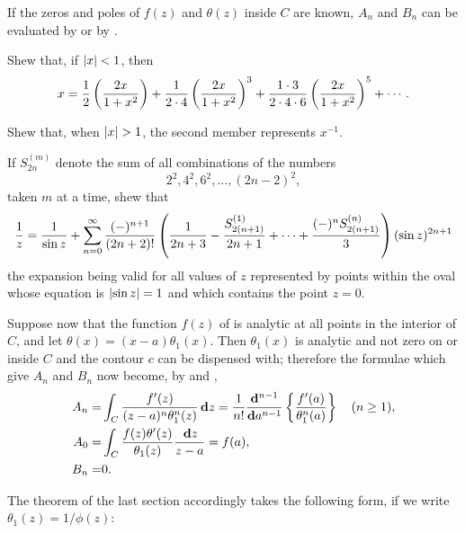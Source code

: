 If the zeros and poles of $f(z)$ and $\theta(z)$ inside $C$ are known,
$A_{n}$ and $B_{n}$ can be evaluated by or
by .

\begin{wandwexample}
  Shew that, if $\left| x \right| < 1$, then
  $$
  x
  =
  \frac{1}{2} \left(  \frac{2x}{1+x^{2}}  \right)
  +
  \frac{1}{2 \cdot 4} \left(  \frac{2x}{1+x^{2}}  \right)^{3}
  +
  \frac{1\cdot 3}{2 \cdot 4 \cdot 6} \left(  \frac{2x}{1+x^{2}}  \right)^{5}
  +
  \cdots.
  $$

  Shew that, when $\left| x \right| > 1$, the second member represents $x^{-1}$.
\end{wandwexample}
If $S^{(m)}_{2n}$ denote the sum of all combinations of the numbers
$$
2^{2}, 4^{2}, 6^{2}, \ldots, (2n-2)^{2},
$$
taken $m$ at a time, shew that
$$
\frac{1}{z}
=
\frac{1}{\sin z}
+
\sum_{n=0}^{\infty}
\frac{(-)^{n+1}}{ (2n+2)! }
\left( 
  \frac{1}{2n+3}
  - \frac{S^{(1)}_{2(n+1)}}{2n+1}
  + \cdots
  + \frac{ (-)^{n} S^{(n)}_{2(n+1)}}{3}
 \right)
(\sin z)^{2n+1}
$$
the expansion being valid for all values of $z$ represented by points
within the oval whose equation is $\left| \sin z \right| = 1$ and which contains the
point $z = 0$. 


Suppose now that the function $f(z)$ of 
is analytic at all points in the interior of $C$, and let
$\theta(x) = (x - a) \theta_{1}(x)$. Then $\theta_{1}(x)$ is
analytic and not zero on or inside $C$ and the contour $c$ can be
dispensed with; therefore the formulae which give $A_{n}$ and
$B_{n}$ now become, by and ,
\begin{align*} %
  A_{n}
  =&
  \int_{C} \frac{f'(z)}{(z-a)^{n} \theta_{1}^{n}(z)} \dmeasure z
  = \frac{1}{n!} \frac{\dd^{n-1}}{\dd a^{n-1}}
  \thebrace{
    \frac{f'(a)}{\theta_{1}^{n}(a)
    }
  }
  \quad (n \geq 1),
  \\
  A_{0}
  =&
  \int_{C} \frac{f(z) \theta'(z)}{\theta_{1}(z)}
  \frac{\dmeasure z}{z-a}
  =
  f(a),
  \\
  B_{n}
  =&
  0.
\end{align*}

%
%

The theorem of the last section accordingly takes the following form,
if we write $\theta_{1}(z) = 1 / \phi(z)$:

